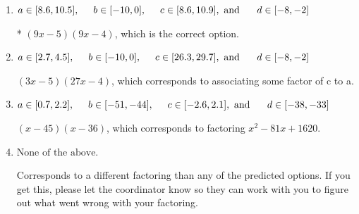 \documentclass{extbook}[14pt]
\begin{document}
\begin{enumerate}
{\begin{enumerate}[label=\Alph*.]
 $(27x -5)(3x -4)$, which corresponds to associating some factor of a to c.
\item \( a \in [8.6, 10.5], \hspace*{5mm} b \in [-10, 0], \hspace*{5mm} c \in [8.6, 10.9], \text{ and } \hspace*{5mm} d \in [-8, -2] \)

* $(9x -5)(9x -4)$, which is the correct option.
\item \( a \in [2.7, 4.5], \hspace*{5mm} b \in [-10, 0], \hspace*{5mm} c \in [26.3, 29.7], \text{ and } \hspace*{5mm} d \in [-8, -2] \)

 $(3x -5)(27x -4)$, which corresponds to associating some factor of c to a.
\item \( a \in [0.7, 2.2], \hspace*{5mm} b \in [-51, -44], \hspace*{5mm} c \in [-2.6, 2.1], \text{ and } \hspace*{5mm} d \in [-38, -33] \)

 $(x -45)(x -36)$, which corresponds to factoring $x^{2} -81 x + 1620$.
\item \( \text{None of the above.} \)

 Corresponds to a different factoring than any of the predicted options. If you get this, please let the coordinator know so they can work with you to figure out what went wrong with your factoring.
\end{enumerate}

}
\end{enumerate}
\end{document}
